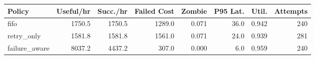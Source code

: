 \begin{tabular}{lrrrrrrr}
\toprule
Policy & Useful/hr & Succ./hr & Failed Cost & Zombie & P95 Lat. & Util. & Attempts \\
\midrule
fifo & 1750.5 & 1750.5 & 1289.0 & 0.071 & 36.0 & 0.942 & 240 \\
retry\_only & 1581.8 & 1581.8 & 1561.0 & 0.071 & 24.0 & 0.939 & 281 \\
failure\_aware & 8037.2 & 4437.2 & 307.0 & 0.000 & 6.0 & 0.959 & 240 \\
\bottomrule
\end{tabular}
